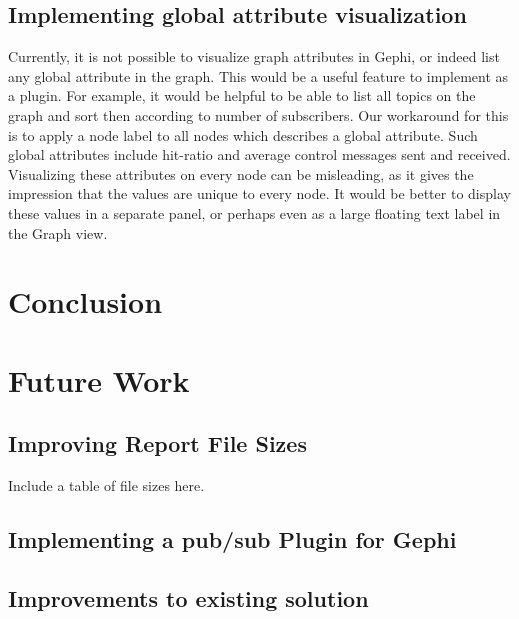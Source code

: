 \subsection{Implementing global attribute visualization}

Currently, it is not possible to visualize graph attributes in Gephi, or
indeed list any global attribute in the graph. This would be a useful
feature to implement as a plugin. For example, it would be helpful to be
able to list all topics on the graph and sort then according to number
of subscribers. Our workaround for this is to apply a node label to all
nodes which describes a global attribute. Such global attributes include
hit-ratio and average control messages sent and received. Visualizing
these attributes on every node can be misleading, as it gives the
impression that the values are unique to every node. It would be better
to display these values in a separate panel, or perhaps even as a large
floating text label in the Graph view.

\section{Conclusion}
\section{Future Work}
\subsection{Improving Report File Sizes}
Include a table of \gexf{} file sizes here.

\subsection{Implementing a pub/sub Plugin for Gephi}
\subsection{Improvements to existing solution}
